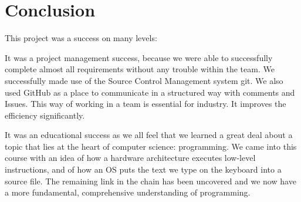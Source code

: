 \documentclass[oneside]{article}
\begin{document}
\section{Conclusion}
This project was a success on many levels:

It was a project management success, because we were able to successfully complete almost all requirements without any trouble within the team. We successfully made use of the Source Control Management system git. We also used GitHub as a place to communicate in a structured way with comments and Issues. This way of working in a team is essential for industry. It improves the efficiency significantly.

It was an educational success as we all feel that we learned a great deal about a topic that lies at the heart of computer science: programming. We came into this course with an idea of how a hardware architecture executes low-level instructions, and of how an OS puts the text we type on the keyboard into a source file. The remaining link in the chain has been uncovered and we now have a more fundamental, comprehensive understanding of programming.
\end{document}
